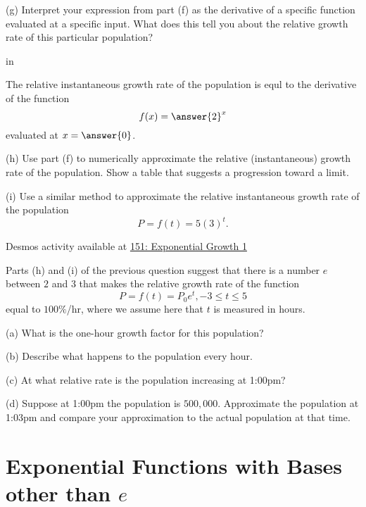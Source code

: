 \documentclass{ximera}
\newcommand{\pskip}{\vskip 0.1 in}
\begin{document}
\begin{question}
(g) Interpret your expression from part (f) as the derivative of a specific function evaluated at a specific input. What does this tell you about the relative growth rate of this particular population?

\pskip

The relative instantaneous growth rate of the population is equl to the derivative of the function
\[
    f(x) = \answer{2}^x
\]
evaluated at $x=\answer{0}$. 

(h) Use part (f) to numerically approximate the relative (instantaneous) growth rate of the population. Show a table that suggests a progression toward a limit.

(i) Use a similar method to approximate the relative instantaneous growth rate of the population
\[
   P = f(t) = 5 (3)^t .
\]



\begin{onlineOnly}
    \begin{center}
\end{center}
\end{onlineOnly}


Desmos activity available at \href{https://www.desmos.com/calculator/omjbec2hpu}{151: Exponential Growth 1}
\end{question}


\begin{question}  \label{Qcgbt4tt}
Parts (h) and (i) of the previous question suggest that there is a number $e$ between $2$ and $3$ that makes the 
relative growth rate of the function 
\[
         P = f(t) = P_0 e^t , -3\leq t \leq 5
\]
equal to $100\%$/hr, where we assume here that $t$ is measured in hours. 

(a) What is the one-hour growth factor for this population?

(b) Describe what happens to the population every hour.

(c) At what relative rate is the population increasing at 1:00pm?

(d) Suppose at 1:00pm the population is $500,000$. Approximate the population at 1:03pm and compare your approximation to the actual population at that time.
\end{question}


\section*{Exponential Functions with Bases other than $e$}
\end{document}
